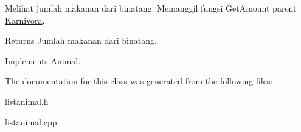 Melihat jumlah makanan dari binatang. Memanggil fungsi Get\+Amount parent \hyperlink{classKarnivora}{Karnivora}. 

\begin{DoxyReturn}{Returns}
Jumlah makanan dari binatang. 
\end{DoxyReturn}


Implements \hyperlink{classAnimal_a3f1cced7bac93f7c88a24ec5a0e989fe}{Animal}.



The documentation for this class was generated from the following files\+:\begin{DoxyCompactItemize}
\item 
listanimal.\+h\item 
listanimal.\+cpp\end{DoxyCompactItemize}
